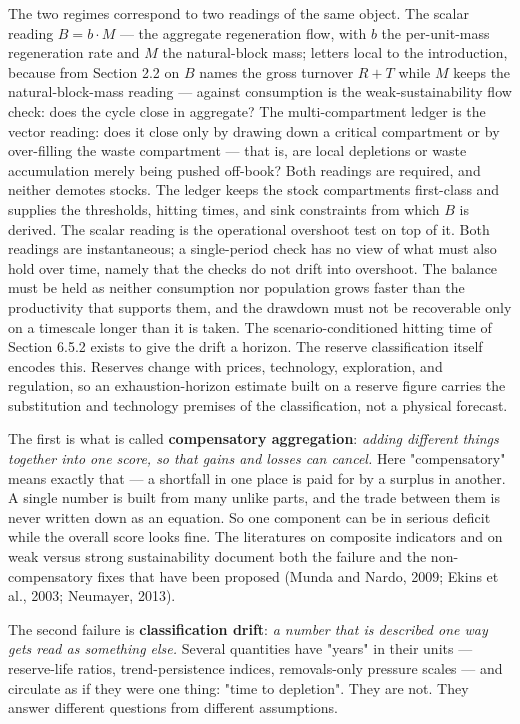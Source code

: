 \documentclass[11pt]{article}
\begin{document}
The two regimes correspond to two readings of the same object. The scalar reading \(B = b\cdot M\) --- the aggregate regeneration flow, with \(b\) the per-unit-mass regeneration rate and \(M\) the natural-block mass; letters local to the introduction, because from Section 2.2 on \(B\) names the gross turnover \(R + T\) while \(M\) keeps the natural-block-mass reading --- against consumption is the weak-sustainability flow check: does the cycle close in aggregate? The multi-compartment ledger is the vector reading: does it close only by drawing down a critical compartment or by over-filling the waste compartment --- that is, are local depletions or waste accumulation merely being pushed off-book? Both readings are required, and neither demotes stocks. The ledger keeps the stock compartments first-class and supplies the thresholds, hitting times, and sink constraints from which \(B\) is derived. The scalar reading is the operational overshoot test on top of it. Both readings are instantaneous; a single-period check has no view of what must also hold over time, namely that the checks do not drift into overshoot. The balance must be held as neither consumption nor population grows faster than the productivity that supports them, and the drawdown must not be recoverable only on a timescale longer than it is taken. The scenario-conditioned hitting time of Section 6.5.2 exists to give the drift a horizon. The reserve classification itself encodes this. Reserves change with prices, technology, exploration, and regulation, so an exhaustion-horizon estimate built on a reserve figure carries the substitution and technology premises of the classification, not a physical forecast.

The first is what is called \textbf{compensatory aggregation}: \emph{adding different things together into one score, so that gains and losses can cancel.} Here "compensatory" means exactly that --- a shortfall in one place is paid for by a surplus in another. A single number is built from many unlike parts, and the trade between them is never written down as an equation. So one component can be in serious deficit while the overall score looks fine. The literatures on composite indicators and on weak versus strong sustainability document both the failure and the non-compensatory fixes that have been proposed (Munda and Nardo, 2009; Ekins et al., 2003; Neumayer, 2013).

The second failure is \textbf{classification drift}: \emph{a number that is described one way gets read as something else.} Several quantities have "years" in their units --- reserve-life ratios, trend-persistence indices, removals-only pressure scales --- and circulate as if they were one thing: "time to depletion". They are not. They answer different questions from different assumptions.
\end{document}
